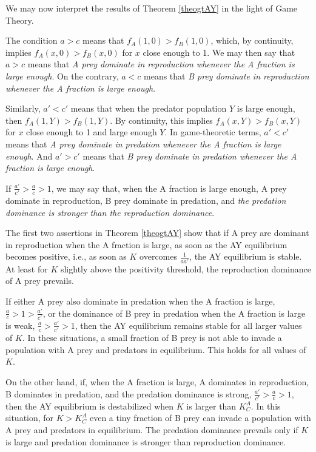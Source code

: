 \documentclass[12pt]{article}
\theoremstyle{definition}
\begin{document}
We may now interpret the results of Theorem \ref{theogtAY} in the light of Game Theory. 

The condition $a>c$ means that $f_A(1,0)>f_B(1,0)$, which, by continuity, implies $f_A(x,0)>f_B(x,0)$ for $x$ close enough to 1. We may then say that $a>c$ means that \emph{A prey dominate in reproduction whenever the A fraction is large enough}. On the contrary, $a<c$ means that \emph{B prey dominate in reproduction whenever the A fraction is large enough}. 

Similarly, $a'<c'$ means that when the predator population $Y$ is large enough, then $f_A(1,Y)>f_B(1,Y)$. By continuity, this implies $f_A(x,Y)>f_B(x,Y)$ for $x$ close enough to 1 and large enough $Y$. In game-theoretic terms, $a'<c'$ means that \emph{A prey dominate in predation whenever the A fraction is large enough}. And $a'>c'$ means that \emph{B prey dominate in predation whenever the A fraction is large enough}.

If $\frac{a'}{c'}>\frac{a}{c}>1$, we may say that, when the A fraction is large enough, A prey dominate in reproduction, B prey dominate in predation, and \emph{the predation dominance is stronger than the reproduction dominance}.

The first two assertions in Theorem \ref{theogtAY} show that if A prey are dominant in reproduction when the A fraction is large, as soon as the AY equilibrium becomes positive, i.e., as soon as $K$ overcomes $\frac{1}{aa'}$, the AY equilibrium is stable. At least for $K$ slightly above the positivity threshold, the reproduction dominance of A prey prevails.

If either A prey also dominate in predation when the A fraction is large, $\frac{a}{c}>1>\frac{a'}{c'}$, or the dominance of B prey in predation when the A fraction is large is weak, $\frac{a}{c}>\frac{a'}{c'}>1$, then the AY equilibrium remains stable for all larger values of $K$. In these situations, a small fraction of B prey is not able to invade a population with A prey and predators in equilibrium. This holds for all values of $K$.

On the other hand, if, when the A fraction is large, A dominates in reproduction, B dominates in predation, and the predation dominance is strong, $\frac{a'}{c'}>\frac{a}{c}>1$, then the AY equilibrium is destabilized when $K$ is larger than $K^A_C$. In this situation, for $K>K^A_C$ even a tiny fraction of B prey can invade a population with A prey and predators in equilibrium. The predation dominance prevails only if $K$ is large and predation dominance is stronger than reproduction dominance.
\end{document}
